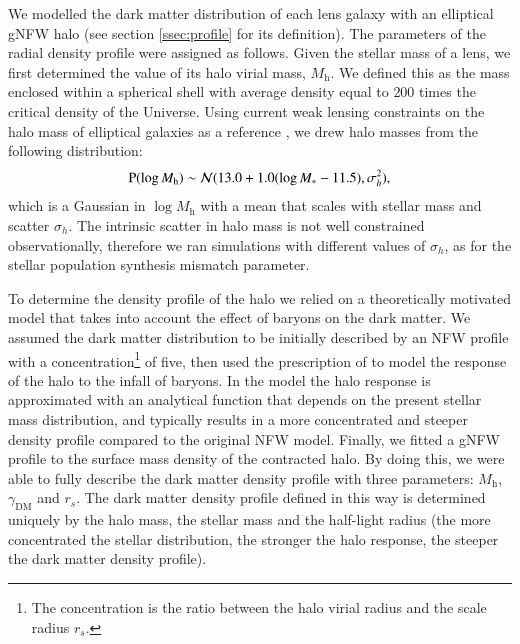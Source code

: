 \documentclass{aa}
\def\mstar{M_*}
\def\gammadm{\gamma_{\mathrm{DM}}}
\def\mhalo{M_{\mathrm{h}}}
\def\pr{{\rm P}}
\begin{document}
We modelled the dark matter distribution of each lens galaxy with an elliptical gNFW halo (see section \ref{ssec:profile} for its definition).
The parameters of the radial density profile were assigned as follows.
Given the stellar mass of a lens, we first determined the value of its halo virial mass, $\mhalo$. We defined this as the mass enclosed within a spherical shell with average density equal to $200$ times the critical density of the Universe.
Using current weak lensing constraints on the halo mass of elliptical galaxies as a reference \citep{Son++22}, we drew halo masses from the following distribution:
\begin{equation}
\pr(\log{\mhalo}) \sim \mathcal{N}(13.0 + 1.0(\log{\mstar} - 11.5), \sigma_h^2),
\end{equation}
which is a Gaussian in $\log{\mhalo}$ with a mean that scales with stellar mass and scatter $\sigma_h$.
The intrinsic scatter in halo mass is not well constrained observationally, therefore we ran simulations with different values of $\sigma_h$, as for the stellar population synthesis mismatch parameter.

To determine the density profile of the halo we relied on a theoretically motivated model that takes into account the effect of baryons on the dark matter.
We assumed the dark matter distribution to be initially described by an NFW profile with a concentration\footnote{The concentration is the ratio between the halo virial radius and the scale radius $r_s$.} of five, then used the prescription of \citet{Cau++20} to model the response of the halo to the infall of baryons. %
In the \citet{Cau++20} model the halo response is approximated with an analytical function that depends on the present stellar mass distribution, and typically results in a more concentrated and steeper density profile compared to the original NFW model. 
Finally, we fitted a gNFW profile to the surface mass density of the contracted halo. By doing this, we were able to fully describe the dark matter density profile with three parameters: $\mhalo$, $\gammadm$ and $r_s$.
%
The dark matter density profile defined in this way is determined uniquely by the halo mass, the stellar mass and the half-light radius (the more concentrated the stellar distribution, the stronger the halo response, the steeper the dark matter density profile).
\end{document}

